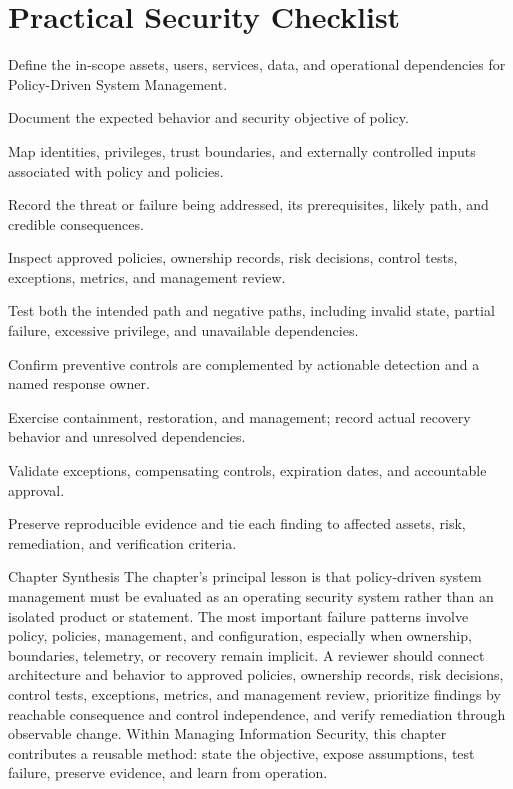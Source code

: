 \documentclass[11pt,letterpaper]{article}
\begin{document}
\section*{Practical Security Checklist}
\begin{CornellChecklist}
\item Define the in-scope assets, users, services, data, and operational dependencies for Policy-Driven System Management.
\item Document the expected behavior and security objective of policy.
\item Map identities, privileges, trust boundaries, and externally controlled inputs associated with policy and policies.
\item Record the threat or failure being addressed, its prerequisites, likely path, and credible consequences.
\item Inspect approved policies, ownership records, risk decisions, control tests, exceptions, metrics, and management review.
\item Test both the intended path and negative paths, including invalid state, partial failure, excessive privilege, and unavailable dependencies.
\item Confirm preventive controls are complemented by actionable detection and a named response owner.
\item Exercise containment, restoration, and management; record actual recovery behavior and unresolved dependencies.
\item Validate exceptions, compensating controls, expiration dates, and accountable approval.
\item Preserve reproducible evidence and tie each finding to affected assets, risk, remediation, and verification criteria.
\end{CornellChecklist}
\begin{CornellSummaryBox}{Chapter Synthesis}
The chapter's principal lesson is that policy-driven system management must be evaluated as an operating security system rather than an isolated product or statement. The most important failure patterns involve policy, policies, management, and configuration, especially when ownership, boundaries, telemetry, or recovery remain implicit. A reviewer should connect architecture and behavior to approved policies, ownership records, risk decisions, control tests, exceptions, metrics, and management review, prioritize findings by reachable consequence and control independence, and verify remediation through observable change. Within Managing Information Security, this chapter contributes a reusable method: state the objective, expose assumptions, test failure, preserve evidence, and learn from operation.
\end{CornellSummaryBox}
\end{document}

